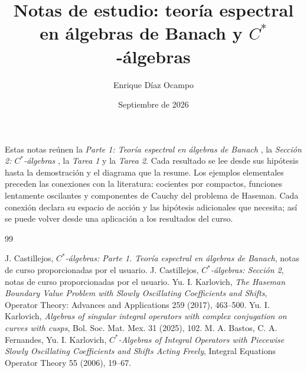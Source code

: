 \documentclass{notes}
\title{Notas de estudio: teoría espectral en álgebras de Banach y $C^*$-álgebras}
\author{Enrique Díaz Ocampo}
\date{Septiembre de 2026}
\begin{document}
\maketitle
\tableofcontents

\begin{context}
Estas notas reúnen la \emph{Parte 1: Teoría espectral en álgebras de Banach}
\cite{CastillejosParte1}, la \emph{Sección 2: $C^*$-álgebras}
\cite{CastillejosCap2}, la \emph{Tarea 1} y la \emph{Tarea 2}. Cada resultado se lee desde
sus hipótesis hasta la demostración y el diagrama que la resume. Los ejemplos
elementales preceden las conexiones con la literatura: cocientes por compactos,
funciones lentamente oscilantes y componentes de Cauchy del problema de
Haseman. Cada conexión declara su espacio de acción y las hipótesis adicionales
que necesita; así se puede volver desde una aplicación a los resultados del curso.
\end{context}










\renewcommand{\bibname}{Referencias de trabajo}
\begin{thebibliography}{99}
 J. Castillejos, \emph{$C^*$-álgebras: Parte 1. Teoría espectral en álgebras de Banach}, notas de curso proporcionadas por el usuario.
 J. Castillejos, \emph{$C^*$-álgebras: Sección 2}, notas de curso proporcionadas por el usuario.
 Yu. I. Karlovich, \emph{The Haseman Boundary Value Problem with Slowly Oscillating Coefficients and Shifts}, Operator Theory: Advances and Applications 259 (2017), 463--500.
 Yu. I. Karlovich, \emph{Algebras of singular integral operators with complex conjugation on curves with cusps}, Bol. Soc. Mat. Mex. 31 (2025), 102.
 M. A. Bastos, C. A. Fernandes, Yu. I. Karlovich, \emph{$C^*$-Algebras of Integral Operators with Piecewise Slowly Oscillating Coefficients and Shifts Acting Freely}, Integral Equations Operator Theory 55 (2006), 19--67.
\end{thebibliography}
\end{document}
